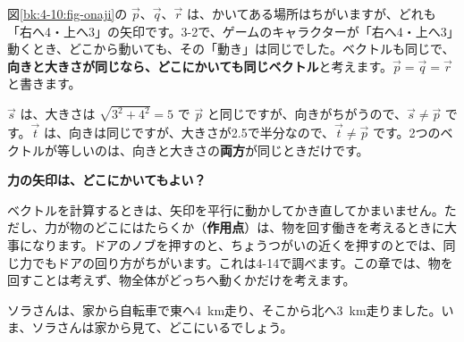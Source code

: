 図\ref{bk:4-10:fig-onaji}の $\vec{p}$、$\vec{q}$、$\vec{r}$ は、かいてある場所はちがいますが、どれも「右へ4・上へ3」の矢印です。3-2で、ゲームのキャラクターが「右へ4・上へ3」動くとき、どこから動いても、その「動き」は同じでした。ベクトルも同じで、\textbf{向きと大きさが同じなら、どこにかいても同じベクトル}と考えます。$\vec{p}=\vec{q}=\vec{r}$ と書きます。

$\vec{s}$ は、大きさは $\sqrt{3^2+4^2}=5$ で $\vec{p}$ と同じですが、向きがちがうので、$\vec{s}\neq\vec{p}$ です。$\vec{t}$ は、向きは同じですが、大きさが2.5で半分なので、$\vec{t}\neq\vec{p}$ です。2つのベクトルが等しいのは、向きと大きさの\textbf{両方}が同じときだけです。

\begin{seikaku}
\textbf{力の矢印は、どこにかいてもよい？}\par
ベクトルを計算するときは、矢印を平行に動かしてかき直してかまいません。ただし、力が物のどこにはたらくか（\textbf{作用点}）は、物を回す働きを考えるときに大事になります。ドアのノブを押すのと、ちょうつがいの近くを押すのとでは、同じ力でもドアの回り方がちがいます。これは4-14で調べます。この章では、物を回すことは考えず、物全体がどっちへ動くかだけを考えます。
\end{seikaku}

{}


\label{bk:4-10:wa}
ソラさんは、家から自転車で東へ\qty{4}{km}走り、そこから北へ\qty{3}{km}走りました。いま、ソラさんは家から見て、どこにいるでしょう。

